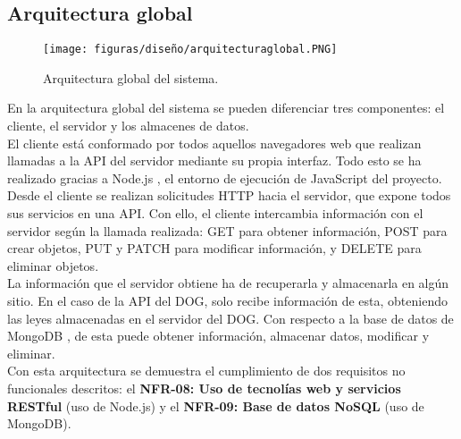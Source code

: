 \subsection{Arquitectura global}

\begin{figure}[H]
\centerline{\texttt{[image: figuras/diseño/arquitecturaglobal.PNG]}}
\caption{Arquitectura global del sistema.}
\label{enlaceArquitecturaGlobal}
\end{figure}

En la arquitectura global del sistema se pueden diferenciar tres componentes: el cliente, el servidor y los almacenes de datos.
\\

El cliente está conformado por todos aquellos navegadores web que realizan llamadas a la API del servidor mediante su propia interfaz. Todo esto se ha realizado gracias a Node.js \cite{nodejs}, el entorno de ejecución de JavaScript del proyecto.
\\

Desde el cliente se realizan solicitudes HTTP hacia el servidor, que expone todos sus servicios en una API. Con ello, el cliente intercambia información con el servidor según la llamada realizada: GET para obtener información, POST para crear objetos, PUT y PATCH para modificar información, y DELETE para eliminar objetos.
\\

La información que el servidor obtiene ha de recuperarla y almacenarla en algún sitio. En el caso de la API del DOG, solo recibe información de esta, obteniendo las leyes almacenadas en el servidor del DOG. Con respecto a la base de datos de MongoDB \cite{mongodb}, de esta puede obtener información, almacenar datos, modificar y eliminar.
\\

Con esta arquitectura se demuestra el cumplimiento de dos requisitos no funcionales descritos: el {\bf NFR-08: Uso de tecnolías web y servicios RESTful} (uso de Node.js) y el {\bf NFR-09: Base de datos NoSQL} (uso de MongoDB).